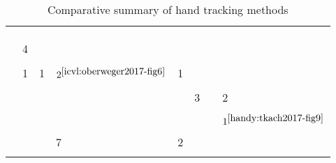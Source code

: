 {\begin{longtable}{| l | l | l | l | l | l | l | l |}
\hline & & & & & & & \\[-1.2em]
%
\cite{mueller2017real} & &	&	&	&	&	&	\\
\hline & & & & & & & \\[-1.2em]
%
\cite{neverova2017hand} & 4&	&	&	&	&	&	\\
\hline & & & & & & & \\[-1.2em]
%
\cite{oberweger2017deepprior++} & 1&	1&	$2^{\ref{icvl:oberweger2017-fig6}}$ &	1&	&	&	\\
\hline & & & & & & & \\[-1.2em]
%
\cite{taylor2017articulated} & &	&	&	&	3&	&	2\\
\hline & & & & & & & \\[-1.2em]
%
\cite{tkach2017online} & &	&	&	&	&	&	$1^{\ref{handy:tkach2017-fig9}}$\\
\hline & & & & & & & \\[-1.2em]
%
\cite{wan2017crossing} & &	&	7&	2&	&	&	\\
\hline

\caption{Comparative summary of hand tracking methods} %
\label{tab:methods_accuracy}
\end{longtable}
}
